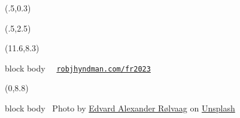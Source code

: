 {
\begin{textblock}{10.5}(.5,0.3)
\fontsize{28}{40}\selectfont\bfseries\sffamily\textcolor[RGB]{204,89,0}{\inserttitle}\\[0.3cm]
\fontsize{12}{12}\selectfont\bfseries\sffamily\textcolor[RGB]{204,89,0}{\insertsubtitle}
\end{textblock}
\begin{textblock}{7.5}(.5,2.5)
\fontsize{13}{13}\selectfont\sffamily\textcolor[RGB]{80,70,60}{\insertauthor}
\end{textblock}
\begin{textblock}{4.2}(11.6,8.3)
\begin{beamercolorbox}[wd=4.3cm,ht=0.35cm,dp=0.2cm]{block body}
\fontsize{10}{10}\sf\color[RGB]{80,70,60}~~\texttt{\href{https://robjhyndman.com/}{robjhyndman.com/fr2023}}
\end{beamercolorbox}
\end{textblock}
\begin{textblock}{6.2}(0,8.8)
\begin{beamercolorbox}[wd=4.7cm]{block body}
\fontsize{6}{6}\sf\color[RGB]{72,45,34}~Photo by \href{https://unsplash.com/@edvardr?utm_source=unsplash&amp;utm_medium=referral&amp;utm_content=creditCopyText}{Edvard Alexander Rølvaag} on \href{https://unsplash.com/s/photos/hierarchy?utm_source=unsplash&amp;utm_medium=referral&amp;utm_content=creditCopyText}{Unsplash}
\end{beamercolorbox}
\end{textblock}}



\usepackage{tikz}
\usepackage{forest}

\usetikzlibrary{trees,shapes,arrows,matrix,shadows,positioning}
\usetikzlibrary{decorations.pathreplacing, arrows, calc, fit, arrows.meta, decorations.pathmorphing, decorations.markings}

